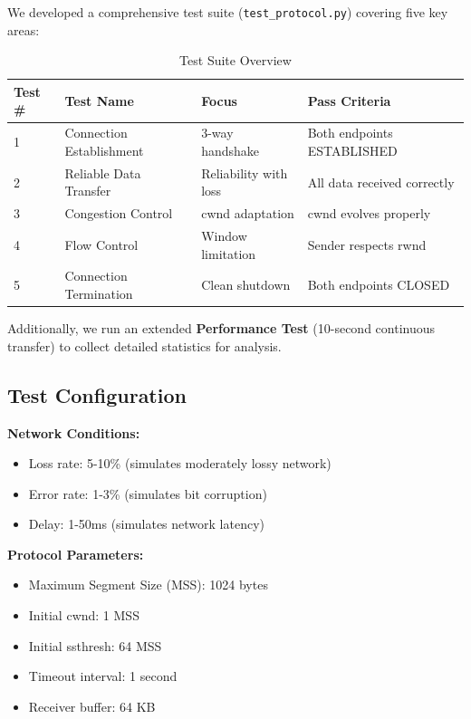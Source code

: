 \documentclass[11pt,a4paper]{article}
\begin{document}
We developed a comprehensive test suite (\texttt{test\_protocol.py}) covering five key areas:

\begin{table}[H]
\centering
\begin{tabular}{@{}llll@{}}
\toprule
\textbf{Test \#} & \textbf{Test Name} & \textbf{Focus} & \textbf{Pass Criteria} \\ \midrule
1 & Connection Establishment & 3-way handshake & Both endpoints ESTABLISHED \\
2 & Reliable Data Transfer & Reliability with loss & All data received correctly \\
3 & Congestion Control & cwnd adaptation & cwnd evolves properly \\
4 & Flow Control & Window limitation & Sender respects rwnd \\
5 & Connection Termination & Clean shutdown & Both endpoints CLOSED \\ \bottomrule
\end{tabular}
\caption{Test Suite Overview}
\end{table}

Additionally, we run an extended \textbf{Performance Test} (10-second continuous transfer) to collect detailed statistics for analysis.

\subsection{Test Configuration}

\textbf{Network Conditions:}
\begin{itemize}
    \item Loss rate: 5-10\% (simulates moderately lossy network)
    \item Error rate: 1-3\% (simulates bit corruption)
    \item Delay: 1-50ms (simulates network latency)
\end{itemize}

\textbf{Protocol Parameters:}
\begin{itemize}
    \item Maximum Segment Size (MSS): 1024 bytes
    \item Initial cwnd: 1 MSS
    \item Initial ssthresh: 64 MSS
    \item Timeout interval: 1 second
    \item Receiver buffer: 64 KB
\end{itemize}
\end{document}
